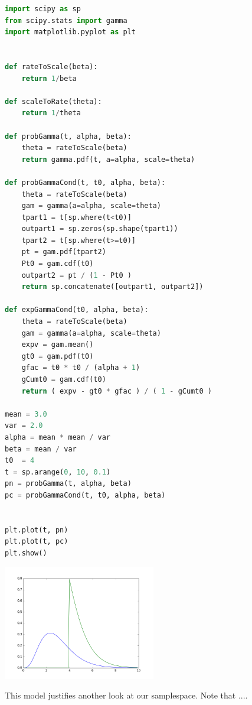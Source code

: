\begin{lstlisting}[language=python]
import scipy as sp
from scipy.stats import gamma
import matplotlib.pyplot as plt


def rateToScale(beta):
    return 1/beta

def scaleToRate(theta):
    return 1/theta

def probGamma(t, alpha, beta):
    theta = rateToScale(beta)
    return gamma.pdf(t, a=alpha, scale=theta)

def probGammaCond(t, t0, alpha, beta):
    theta = rateToScale(beta)
    gam = gamma(a=alpha, scale=theta)
    tpart1 = t[sp.where(t<t0)]
    outpart1 = sp.zeros(sp.shape(tpart1))
    tpart2 = t[sp.where(t>=t0)]
    pt = gam.pdf(tpart2)
    Pt0 = gam.cdf(t0)
    outpart2 = pt / (1 - Pt0 )
    return sp.concatenate([outpart1, outpart2])

def expGammaCond(t0, alpha, beta):
    theta = rateToScale(beta)
    gam = gamma(a=alpha, scale=theta)
    expv = gam.mean()
    gt0 = gam.pdf(t0)
    gfac = t0 * t0 / (alpha + 1)
    gCumt0 = gam.cdf(t0)
    return ( expv - gt0 * gfac ) / ( 1 - gCumt0 )

mean = 3.0
var = 2.0
alpha = mean * mean / var
beta = mean / var
t0  = 4
t = sp.arange(0, 10, 0.1)
pn = probGamma(t, alpha, beta)
pc = probGammaCond(t, t0, alpha, beta)


plt.plot(t, pn)
plt.plot(t, pc)
plt.show()
\end{lstlisting}


\includegraphics[width=0.5\textwidth]{images/beta_conditional.png}


This model justifies another look at our samplespace. Note that ....
